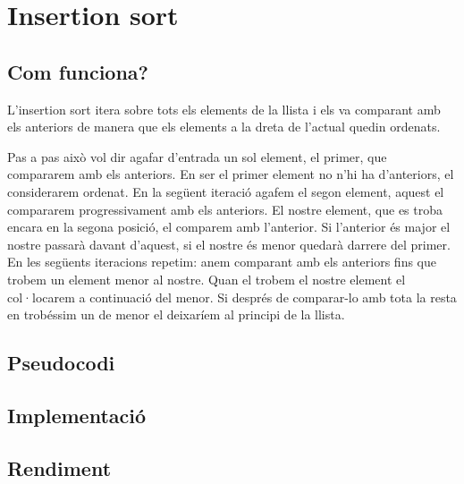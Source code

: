 \chapter{Insertion sort}

\section{Com funciona?}
L'insertion sort itera sobre tots els elements de la llista i els va comparant amb els anteriors de manera que els elements a la dreta de l'actual quedin ordenats.

Pas a pas això vol dir agafar d'entrada un sol element, el primer, que compararem amb els anteriors. En ser el primer element no n'hi ha d'anteriors, el considerarem ordenat.
En la següent iteració agafem el segon element, aquest el compararem progressivament amb els anteriors. El nostre element, que es troba encara en la segona posició, el comparem amb l'anterior. Si l'anterior és major el nostre passarà davant d'aquest, si el nostre és menor quedarà darrere del primer.
En les següents iteracions repetim: anem comparant amb els anteriors fins que trobem un element menor al nostre. Quan el trobem el nostre element el col·locarem a continuació del menor. Si després de comparar-lo amb tota la resta en trobéssim un de menor el deixaríem al principi de la llista.

\section{Pseudocodi}

\section{Implementació}


\section{Rendiment}
\noindent
\makebox[\textwidth][c]{
	
}
